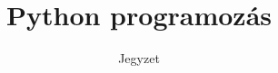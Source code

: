 \documentclass[12pt]{article}
\begin{document}
\title{Python programozás}
\author{Jegyzet}
\date{}
\maketitle

\clearpage

\tableofcontents

\clearpage







\end{document}
